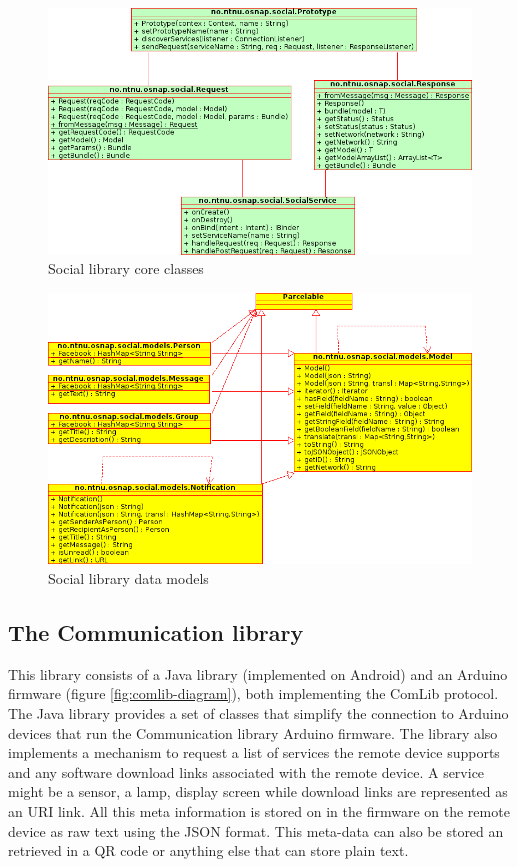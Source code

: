 \begin{figure}[h!]
	\centering \includegraphics[scale=0.8]{img/architecture-socialclasses.png}
	\caption{Social library core classes}
	\label{fig:social-classes}
\end{figure}

\begin{figure}[h!]
	\centering \includegraphics[scale=0.8]{img/architecture-modelclasses.png}
	\caption{Social library data models}
	\label{fig:model-classes}
\end{figure}


\subsection{The Communication library}
This library consists of a Java library (implemented on Android) and an Arduino firmware (figure \ref{fig:comlib-diagram}),
both implementing the ComLib protocol. The Java library provides a set of classes that simplify the connection to Arduino
devices that run the Communication library Arduino firmware. The library also implements a mechanism to request a list of 
services the remote device supports and any software download links associated with the remote device. A service might
be a sensor, a lamp, display screen while download links are represented as an URI link. All this meta information is stored
on in the firmware on the remote device as raw text using the JSON format. This meta-data can also be stored an retrieved
in a QR code or anything else that can store plain text.

